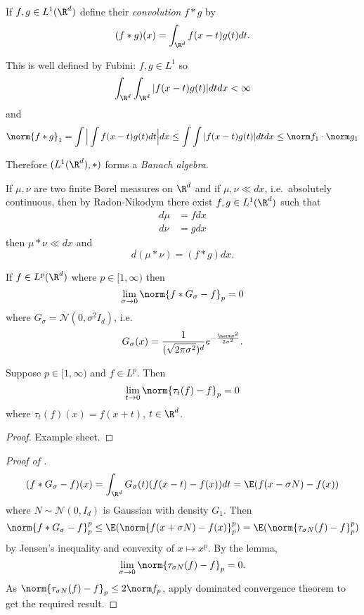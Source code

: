 \documentclass[a4paper]{article}
\begin{document}
\begin{definition}[convolution]
  If \(f, g \in L^1(\R^d)\) define their \emph{convolution} \(f * g\) by
  \[
    (f * g) (x) = \int_{\R^d} f(x - t) g(t) dt.
  \]
\end{definition}

This is well defined by Fubini: \(f, g \in L^1\) so
\[
  \int_{\R^d} \int_{\R^d} |f(x - t) g(t)| dt dx < \infty
\]
and
\[
  \norm{f * g}_1
  = \int \Big| \int f(x - t) g(t) dt \Big| dx
  \leq \int \int |f(x - t) g(t)| dt dx
  \leq \norm f_1 \cdot \norm g_1
\]

Therefore \((L^1(\R^d), *)\) forms a \emph{Banach algebra}.

\begin{remark}
  If \(\mu, \nu\) are two finite Borel measures on \(\R^d\) and if \(\mu, \nu \ll dx\), i.e.\ absolutely continuous, then by Radon-Nikodym there exist \(f, g \in L^1(\R^d)\) such that
  \begin{align*}
    d\mu &= f dx \\
    d\nu &= g dx
  \end{align*}
  then \(\mu * \nu \ll dx\)  and
  \[
    d(\mu * \nu) = (f * g) dx.
  \]
\end{remark}

\begin{proposition}
  \label{prop:Gaussian approximation}
  If \(f \in L^p(\R^d)\) where \(p \in [1, \infty)\) then
  \[
    \lim_{\sigma \to 0} \norm{f * G_\sigma - f}_p = 0
  \]
  where \(G_\sigma = \mathcal N(0, \sigma^2 I_d)\), i.e.
  \[
    G_\sigma(x) = \frac{1}{(\sqrt{2\pi \sigma^2})^d} e^{- \frac{\norm x^2}{2\sigma^2}}.
  \]
\end{proposition}

\begin{lemma}
  Suppose \(p \in [1, \infty)\)  %
  and \(f \in L^p\). Then
  \[
    \lim_{t \to 0} \norm{\tau_t(f) - f}_p = 0
  \]
  where \(\tau_t(f)(x) = f(x + t)\), \(t \in \R^d\).
\end{lemma}

\begin{proof}
  Example sheet.
\end{proof}

\begin{proof}[Proof of ]
  \[
    (f * G_\sigma - f)(x)
    = \int_{\R^d} G_\sigma(t) (f(x - t) - f(x)) dt
    = \E(f(x - \sigma N) - f(x))
  \]
  where \(N \sim \mathcal N(0, I_d)\) is Gaussian with density \(G_1\). Then
  \[
    \norm{f *G_\sigma - f}_p^p
    \leq \E(\norm{f(x + \sigma N) - f(x)}_p^p)
    = \E(\norm{\tau_{\sigma N}(f) - f}_p^p)
  \]
  by Jensen's inequality and convexity of \(x \mapsto x^p\). By the lemma,
  \[
    \lim_{\sigma \to 0} \norm{\tau_{\sigma N}(f) - f}_p = 0.
  \]
  As \(\norm{\tau_{\sigma N}(f) - f}_p \leq 2 \norm f_p\), apply dominated convergence theorem to get the required result.
\end{proof}
\end{document}
